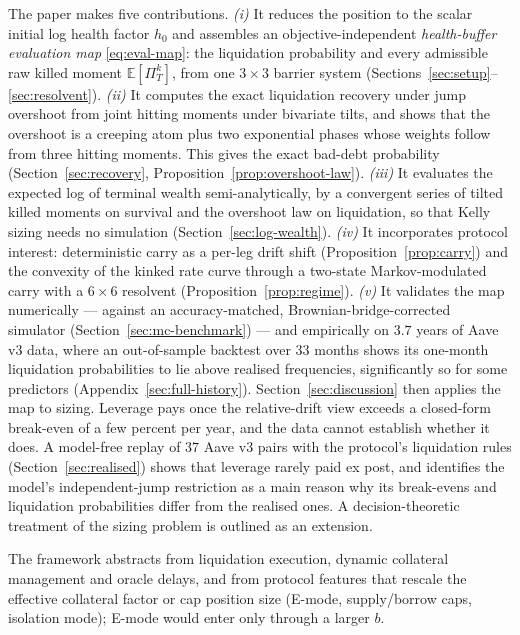 \documentclass[11pt]{article}
\newcommand{\E}{\mathbb{E}}
\theoremstyle{plain}
\theoremstyle{definition}
\theoremstyle{remark}
\begin{document}
The paper makes five contributions.
\emph{(i)} It reduces the position to the scalar initial log health factor $h_0$ and assembles an
objective-independent \emph{health-buffer evaluation map} \eqref{eq:eval-map}: the liquidation
probability and every admissible raw killed moment $\E[\Pi_T^k]$, from one $3\times3$ barrier system
(Sections~\ref{sec:setup}--\ref{sec:resolvent}).
\emph{(ii)} It computes the exact liquidation recovery under jump overshoot from joint hitting
moments under bivariate tilts, and shows that the overshoot is a creeping atom plus two exponential
phases whose weights follow from three hitting moments. This gives the exact bad-debt probability
(Section~\ref{sec:recovery}, Proposition~\ref{prop:overshoot-law}).
\emph{(iii)} It evaluates the expected log of terminal wealth semi-analytically, by a convergent
series of tilted killed moments on survival and the overshoot law on liquidation, so that Kelly
sizing needs no simulation (Section~\ref{sec:log-wealth}).
\emph{(iv)} It incorporates protocol interest: deterministic carry as a per-leg drift shift
(Proposition~\ref{prop:carry}) and the convexity of the kinked rate curve through a two-state
Markov-modulated carry with a $6\times6$ resolvent (Proposition~\ref{prop:regime}).
\emph{(v)} It validates the map numerically --- against an accuracy-matched, Brownian-bridge-corrected
simulator (Section~\ref{sec:mc-benchmark}) --- and empirically on $3.7$ years of Aave v3 data, where an
out-of-sample backtest over $33$ months shows its one-month liquidation probabilities to lie above
realised frequencies, significantly so for some predictors (Appendix~\ref{sec:full-history}).
Section~\ref{sec:discussion} then applies the map to sizing. Leverage pays once the relative-drift
view exceeds a closed-form break-even of a few percent per year, and the data cannot establish
whether it does. A model-free replay of $37$ Aave v3 pairs with the protocol's liquidation rules
(Section~\ref{sec:realised}) shows that leverage rarely paid ex post, and identifies the model's
independent-jump restriction as a main reason why its break-evens and liquidation probabilities
differ from the realised ones. A decision-theoretic treatment of the sizing problem is outlined as an extension.

The framework abstracts from liquidation execution, dynamic collateral management and oracle
delays, and from protocol features that rescale the effective collateral factor or cap position
size (E-mode, supply/borrow caps, isolation mode); E-mode would enter only through a larger $b$.
\end{document}
